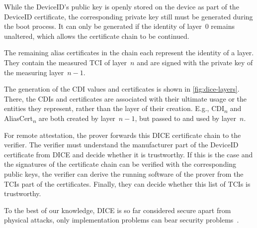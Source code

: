 
While the DeviceID's public key is openly stored on the device as part of the DeviceID certificate, the corresponding private key still must be generated during the boot process.
It can only be generated if the identity of layer~0 remains unaltered, which allows the certificate chain to be continued.


The remaining alias certificates in the chain each represent the identity of a layer.
They contain the measured \ac{TCI} of layer~\( n \) and are signed with the private key of the measuring layer~\( n-1 \).


The generation of the \ac{CDI} values and certificates is shown in \autoref{fig:dice-layers}.
There, the \acp{CDI} and certificates are associated with their ultimate usage or the entities they represent, rather than the layer of their creation.
E.g., CDI\textsubscript{\(n\)} and AliasCert\textsubscript{\(n\)} are both created by layer~\( n-1 \), but passed to and used by layer~\( n \).


For remote attestation, the prover forwards this DICE certificate chain to the verifier.
The verifier must understand the manufacturer part of the DeviceID certificate from DICE and decide whether it is trustworthy.
If this is the case and the signatures of the certificate chain can be verified with the corresponding public keys, the verifier can derive the running software of the prover from the \acp{TCI} part of the certificates.
Finally, they can decide whether this list of \acp{TCI} is trustworthy.


To the best of our knowledge, \ac{DICE} is so far considered secure apart from physical attacks, only implementation problems can bear security problems~\cite{Jaeger2020, Hristozov2022}.
